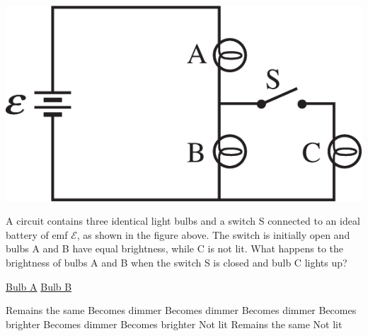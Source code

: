 
\begin{center}
    \includegraphics[scale=0.3]{images/img-009-012.png}
\end{center}

\begin{questions}
\setcounter{question}{20}

\question
A circuit contains three identical light bulbs and a switch S connected to an ideal battery of emf $\mathcal{E}$, as shown in the figure above. The switch is initially open and bulbs A and B have equal brightness, while C is not lit. What happens to the brightness of bulbs A and B when the switch S is closed and bulb C lights up?

\tabto{0.75cm} \underline{Bulb A}
\tabto{5cm} \underline{Bulb B}

\begin{choices}
    \choice Remains the same \tabto{4.25cm} Becomes dimmer
    \choice Becomes dimmer   \tabto{4.25cm} Becomes dimmer
    \choice Becomes brighter \tabto{4.25cm} Becomes dimmer
    \choice Becomes brighter \tabto{4.25cm} Not lit
    \choice Remains the same \tabto{4.25cm} Not lit
\end{choices}

\end{questions}
